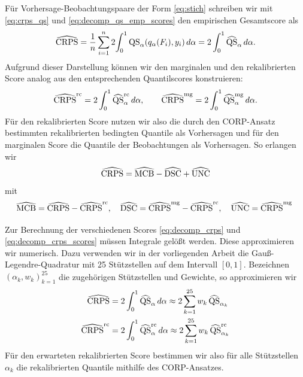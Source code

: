 Für Vorhersage-Beobachtungspaare der Form \eqref{eq:stich} schreiben wir mit \eqref{eq:crps_qs} und \eqref{eq:decomp_qs_emp_scores} den empirischen Gesamtscore als
\begin{equation}\label{eq:decomp_crps}
    \widehat{\mathrm{CRPS}}= \frac{1}{n}\sum_{i=1}^{n} 2\!\int_0^1 \mathrm{QS}_\alpha(q_\alpha(F_i),y_i)\,d\alpha = 2 \int_0^1\widehat{\mathrm{QS}}_\alpha \,d\alpha.
\end{equation} 
Aufgrund dieser Darstellung können wir den marginalen und den rekalibrierten Score analog aus den entsprechenden Quantilscores konstruieren:
\begin{equation} \label{eq:decomp_crps_scores}
  \widehat{\mathrm{CRPS}}^{\mathrm{rc}}=2 \int_0^1\widehat{\mathrm{QS}}^{\mathrm{rc}}_\alpha \,d\alpha, \quad \quad
  \widehat{\mathrm{CRPS}}^{\mathrm{mg}}=2 \int_0^1\widehat{\mathrm{QS}}^{\mathrm{mg}}_\alpha \,d\alpha .
\end{equation}
Für den rekalibrierten Score nutzen wir also die durch den CORP-Ansatz bestimmten rekalibrierten bedingten Quantile als Vorhersagen und für den marginalen Score die Quantile der Beobachtungen als Vorhersagen. So erlangen wir
\[
\widehat{\mathrm{CRPS}} = \widehat{\mathrm{MCB}} - \widehat{\mathrm{DSC}} + \widehat{\mathrm{UNC}}\\
\]
mit
\[
\widehat{\mathrm{MCB}}=\widehat{\mathrm{CRPS}} - \widehat{\mathrm{CRPS}}^{\mathrm{rc}}, \quad
\widehat{\mathrm{DSC}}=\widehat{\mathrm{CRPS}}^{\mathrm{mg}} - \widehat{\mathrm{CRPS}}^{\mathrm{rc}}, \quad
\widehat{\mathrm{UNC}}= \widehat{\mathrm{CRPS}}^{\mathrm{mg}}\;
\]

Zur Berechnung der verschiedenen Scores \eqref{eq:decomp_crps} und \eqref{eq:decomp_crps_scores} müssen Integrale gelößt werden. Diese approximieren wir numerisch. Dazu verwenden wir in der vorliegenden Arbeit die Gauß-Legendre-Quadratur \parencite{gautschi2004orthogonal} mit 25 Stützstellen auf dem Intervall $[0,1]$. Bezeichnen $(\alpha_k,w_k)^{25}_{k=1}$ die zugehörigen Stützstellen und Gewichte, so approximieren wir
\begin{align}
    \widehat{\mathrm{CRPS}}& = 2\int_0^1\widehat{\mathrm{QS}}_\alpha \,d\alpha \approx 2 \sum_{k=1}^{25}w_k\, \widehat{\mathrm{QS}}_{\alpha_k}  \\
    \widehat{\mathrm{CRPS}}^{\mathrm{rc}}&=2 \int_0^1\widehat{\mathrm{QS}}^{\mathrm{rc}}_\alpha \,d\alpha \approx 2 \sum_{k=1}^{25}w_k\, \widehat{\mathrm{QS}}^{\mathrm{rc}}_{\alpha_k}
\end{align}
Für den erwarteten rekalibrierten Score bestimmen wir also für alle Stützstellen $\alpha_k$ die rekalibrierten Quantile mithilfe des CORP-Ansatzes.

